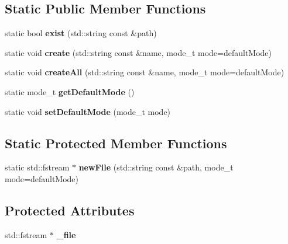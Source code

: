\subsection*{Static Public Member Functions}
\begin{DoxyCompactItemize}
\item 
\hypertarget{classstb_1_1Basic__File_aba883903684b4eaaadf21f53723ea8a8}{static bool {\bfseries exist} (std\+::string const \&path)}\label{classstb_1_1Basic__File_aba883903684b4eaaadf21f53723ea8a8}

\item 
\hypertarget{classstb_1_1Basic__File_a39934f8d33ba794e7a7e25f54877db76}{static void {\bfseries create} (std\+::string const \&name, mode\+\_\+t mode=default\+Mode)}\label{classstb_1_1Basic__File_a39934f8d33ba794e7a7e25f54877db76}

\item 
\hypertarget{classstb_1_1Basic__File_a9f9baea0fd71295f3d26efc2c6e8ce2e}{static void {\bfseries create\+All} (std\+::string const \&name, mode\+\_\+t mode=default\+Mode)}\label{classstb_1_1Basic__File_a9f9baea0fd71295f3d26efc2c6e8ce2e}

\item 
\hypertarget{classstb_1_1Basic__File_acc9577da148159176a5e39e1929d72aa}{static mode\+\_\+t {\bfseries get\+Default\+Mode} ()}\label{classstb_1_1Basic__File_acc9577da148159176a5e39e1929d72aa}

\item 
\hypertarget{classstb_1_1Basic__File_ad151b208fb6b2025340170791148674e}{static void {\bfseries set\+Default\+Mode} (mode\+\_\+t mode)}\label{classstb_1_1Basic__File_ad151b208fb6b2025340170791148674e}

\end{DoxyCompactItemize}
\subsection*{Static Protected Member Functions}
\begin{DoxyCompactItemize}
\item 
\hypertarget{classstb_1_1Basic__File_a6eca19a05e4c4b75d3dc00d86f0709c5}{static std\+::fstream $\ast$ {\bfseries new\+File} (std\+::string const \&path, mode\+\_\+t mode=default\+Mode)}\label{classstb_1_1Basic__File_a6eca19a05e4c4b75d3dc00d86f0709c5}

\end{DoxyCompactItemize}
\subsection*{Protected Attributes}
\begin{DoxyCompactItemize}
\item 
\hypertarget{classstb_1_1Basic__File_a33ae236e5ee2208a5df7008a53388199}{std\+::fstream $\ast$ {\bfseries \+\_\+file}}\label{classstb_1_1Basic__File_a33ae236e5ee2208a5df7008a53388199}

\end{DoxyCompactItemize}

